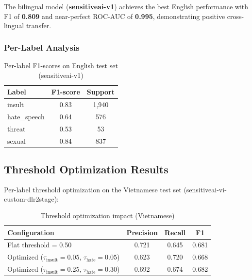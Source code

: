 \documentclass[12pt,a4paper]{article}
\begin{document}
The bilingual model (\textbf{sensitiveai-v1}) achieves the best English performance with F1 of \textbf{0.809} and near-perfect ROC-AUC of \textbf{0.995}, demonstrating positive cross-lingual transfer.

\subsubsection{Per-Label Analysis}

\begin{table}[htbp]
    \centering
    \caption{Per-label F1-scores on English test set (sensitiveai-v1)}
    \label{tab:per_label}
    \begin{tabular}{@{}lcc@{}}
        \toprule
        \textbf{Label} & \textbf{F1-score} & \textbf{Support} \\
        \midrule
        insult       & 0.83 & 1,940 \\
        hate\_speech & 0.64 & 576 \\
        threat       & 0.53 & 53 \\
        sexual       & 0.84 & 837 \\
        \bottomrule
    \end{tabular}
\end{table}

\subsection{Threshold Optimization Results}

Per-label threshold optimization on the Vietnamese test set (sensitiveai-vi-custom-dlr2stage):

\begin{table}[htbp]
    \centering
    \caption{Threshold optimization impact (Vietnamese)}
    \label{tab:threshold}
    \begin{tabular}{@{}lccc@{}}
        \toprule
        \textbf{Configuration} & \textbf{Precision} & \textbf{Recall} & \textbf{F1} \\
        \midrule
        Flat threshold = 0.50    & 0.721 & 0.645 & 0.681 \\
        Optimized ($\tau_{\text{insult}}=0.05$, $\tau_{\text{hate}}=0.05$) & 0.623 & 0.720 & 0.668 \\
        Optimized ($\tau_{\text{insult}}=0.25$, $\tau_{\text{hate}}=0.30$) & 0.692 & 0.674 & 0.682 \\
        \bottomrule
    \end{tabular}
\end{table}
\end{document}
